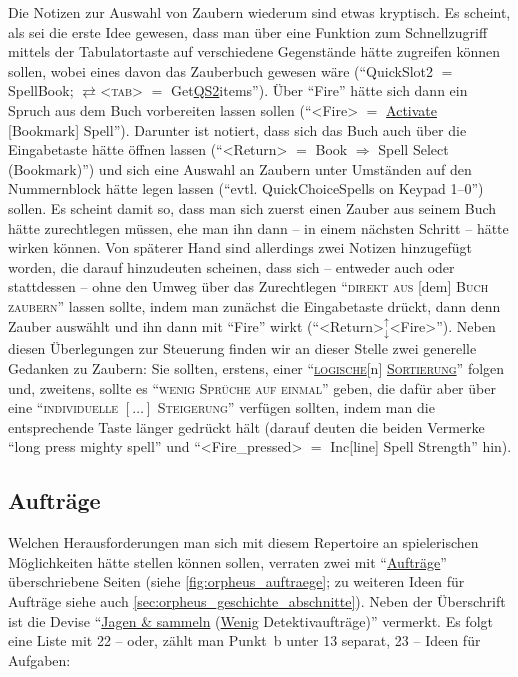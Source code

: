 \documentclass[a5paper,pagesize,numbers=noenddot]{scrbook}
\begin{document}
Die Notizen zur Auswahl von Zaubern wiederum sind etwas kryptisch.
Es scheint, als sei die erste Idee gewesen, dass man über eine Funktion zum Schnellzugriff mittels der Tabulatortaste auf verschiedene Gegenstände hätte zugreifen können sollen, wobei eines davon das Zauberbuch gewesen wäre (\enquote{QuickSlot2 $=$ SpellBook; $\rightleftarrows$<\textsc{tab}> $=$ Get\uline{QS2}items}).
Über \enquote{Fire} hätte sich dann ein Spruch aus dem Buch vorbereiten lassen sollen (\enquote{<Fire> $=$ \uline{Activate} [Bookmark] Spell}).
Darunter ist notiert, dass sich das Buch auch über die Eingabetaste hätte öffnen lassen (\enquote{<Return> $=$ Book $\Rightarrow$ Spell Select (Bookmark)}) und sich eine Auswahl an Zaubern unter Umständen auf den Nummernblock hätte legen lassen (\enquote{evtl. QuickChoiceSpells on Keypad 1--0}) sollen.
Es scheint damit so, dass man sich zuerst einen Zauber aus seinem Buch hätte zurechtlegen müssen, ehe man ihn dann -- in einem nächsten Schritt -- hätte wirken können.
Von späterer Hand sind allerdings zwei Notizen hinzugefügt worden, die darauf hinzudeuten scheinen, dass sich -- entweder auch oder stattdessen -- ohne den Umweg über das Zurechtlegen \enquote{\textsc{direkt aus} [dem] \textsc{Buch zaubern}} lassen sollte, indem man zunächst die Eingabetaste drückt, dann denn Zauber auswählt und ihn dann mit \enquote{Fire} wirkt (\enquote{<Return>$_{\downarrow}^{\uparrow}$<Fire>}).
Neben diesen Überlegungen zur Steuerung finden wir an dieser Stelle zwei generelle Gedanken zu Zaubern:
Sie sollten, erstens, einer \enquote{\textsc{\uline{logische}}[n] \textsc{\uline{Sortierung}}} folgen und, zweitens, sollte es \enquote{\textsc{wenig Sprüche auf einmal}} geben, die dafür aber über eine \enquote{\textsc{individuelle $[\dots]$ Steigerung}} verfügen sollten, indem man die entsprechende Taste länger gedrückt hält (darauf deuten die beiden Vermerke \enquote{long press mighty spell} und \enquote{<Fire\_pressed> $=$ Inc[line] Spell Strength} hin).\autocite[S.~3]{orpheus_interface}


\subsection{Aufträge}\label{sec:orpheus_mechanik_auftraege}
Welchen Herausforderungen man sich mit diesem Repertoire an spielerischen Möglichkeiten hätte stellen können sollen, verraten zwei mit \enquote{\uline{Aufträ\-ge}} überschriebene Seiten (siehe \autoref{fig:orpheus_auftraege}; zu weiteren Ideen für Aufträge siehe auch \autoref{sec:orpheus_geschichte_abschnitte}).\autocite[Vgl.][S.~16--17]{orpheus_b_scribbles}
Neben der Überschrift ist die Devise \enquote{\uline{Jagen \& sammeln} (\uline{Wenig} Detektivaufträge)} vermerkt.
Es folgt eine Liste mit 22 -- oder, zählt man Punkt~b unter 13 separat, 23 -- Ideen für Aufgaben:
\end{document}
